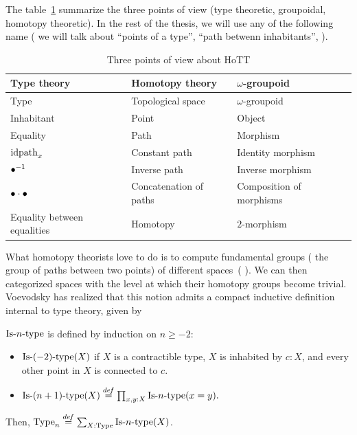 The table~\ref{fig:3pw} summarize the three points of view (type
theoretic, groupoidal, homotopy theoretic). In the rest of the thesis,
we will use any of the following name (\eg{} we will talk about
``points of a type'', ``path betwenn inhabitants'', \etc{}).

\begin{table}[h]
  \centering
  \begin{tabular}{|l|l|l|}
    \hline
    Type theory & Homotopy theory & $\omega$-groupoid \\
    \hline \hline
    Type & Topological space & $\omega$-groupoid \\
    \hline
    Inhabitant & Point & Object \\
    \hline
    Equality & Path & Morphism \\
    \hline
    $\mathrm{idpath}_x$ & Constant path & Identity morphism \\
    \hline
    $\bullet^{-1}$ & Inverse path & Inverse morphism \\
    \hline
    $\bullet\cdot \bullet$ & Concatenation of paths & Composition of
                                                       morphisms \\
    \hline
    Equality between equalities & Homotopy & $2$-morphism\\
    \hline
  \end{tabular}
  \caption{Three points of view about HoTT}
  \label{fig:3pw}
\end{table}


What homotopy theorists love to do is to compute fundamental groups
(\ie{} the group of paths between two points) of
different spaces~(\cite{wangxu}
\cite{hutchings2011introduction}). We
can then categorized spaces with the level at which their homotopy
groups become trivial. Voevodsky has realized that this notion admits
a compact inductive definition internal to type theory, given by
\begin{defi}
  $\mathop{\mathrm{Is{\hbox{-}}}n\mathrm{{\hbox{-}} type}}$ is defined by induction on $n\geqslant -2$:
  \begin{itemize}
  \item $\mathop{\mathrm{Is{\hbox{-}}}(-2)\mathrm{{\hbox{-}} type}}(X)$ if $X$ is a contractible type, \ie{} $X$
    is inhabited by $c:X$, and every other point in $X$ is connected to $c$.
  \item $\mathop{\mathrm{Is{\hbox{-}}}(n+1)\mathrm{{\hbox{-}} type}}(X) \overset{de\hspace{-0.2ex}f}{=} \prod_{x,y:X} \mathop{\mathrm{Is{\hbox{-}}}n\mathrm{{\hbox{-}} type}} (x=y).$
  \end{itemize}
  Then, $\operatorname{Type}_n \overset{de\hspace{-0.2ex}f}{=} \sum_{X:\operatorname{Type}} \mathop{\mathrm{Is{\hbox{-}}}n\mathrm{{\hbox{-}} type}}(X)$.
\end{defi}

